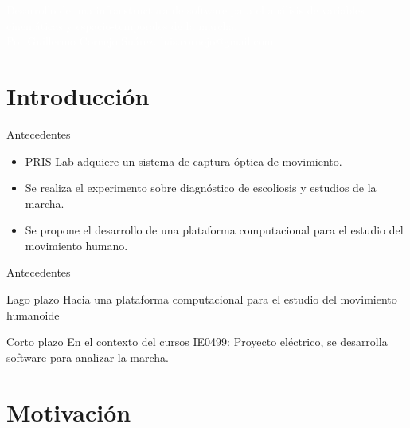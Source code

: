\documentclass[aspectratio=169,spanish]{beamer} %
\newcommand{\fullbackground}[1]{\usebackgroundtemplate{\texttt{[image: \#1]}}}
\begin{document}
\fullbackground{images/opening.png}

\begin{frame}
\vspace{6cm}
\centering
\textcolor{white}{%
Desarrollo de una infraestructura de software para el análisis de variables cinemáticas y espacio-temporales de la marcha. \\ \vspace{1cm}
Por Guillermo Cornejo Suárez. luis.cornejo@gmail.com 
}
\end{frame}

\fullbackground{images/slide.png}

\section{Introducción}

\begin{frame}{Antecedentes}
    \begin{itemize}
        \item PRIS-Lab adquiere un sistema de captura óptica de movimiento.
        \item Se realiza el experimento sobre diagnóstico de escoliosis y estudios de la marcha.
        \item Se propone el desarrollo de una plataforma computacional para el estudio del movimiento humano. 
    \end{itemize}
\end{frame}

\begin{frame}{Antecedentes}
    \begin{block}{Lago plazo}
        Hacia una plataforma computacional para el estudio del movimiento humanoide
    \end{block}
    \begin{block}{Corto plazo}
        En el contexto del cursos IE0499: Proyecto eléctrico, se desarrolla software para analizar la marcha. 
    \end{block}
\end{frame}

\section{Motivación}
\end{document}
